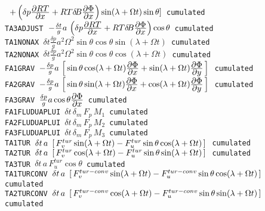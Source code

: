 \begin{tabbing}
        \tt                     \> $+\left(\delta p\frac{\displaystyle \partial RT}{\displaystyle \partial x}+RT\delta\! B\frac{\displaystyle \partial \Phi}{\displaystyle \partial x}\right)\sin(\lambda+\Omega t)\sin\theta]$ \> cumulated\\ [1ex]
        \tt TA3ADJUST           \> $-\frac{\delta t}{g}a\, \left(\delta p\frac{\displaystyle \partial RT}{\displaystyle \partial x}+RT\delta\! B\frac{\displaystyle \partial \Phi}{\displaystyle \partial x}\right)\cos\theta$ \> cumulated\\ [1ex]
        \tt TA1NONAX            \> $\delta t \frac{\delta p}{g} a^2 \Omega^2 \sin\theta \cos\theta\sin(\lambda+\Omega t)$ \> cumulated\\ [1ex]
        \tt TA2NONAX            \> $\delta t \frac{\delta p}{g} a^2 \Omega^2 \sin\theta \cos\theta\cos(\lambda+\Omega t)$ \> cumulated\\ [1ex]
        \tt FA1GRAV             \> $-\frac{\delta p}{g}a\, \left[ \,\sin\theta\cos(\lambda+\Omega t)\frac{\displaystyle \partial \Phi}{\displaystyle \partial x}+\sin(\lambda+\Omega t)\frac{\displaystyle \partial \Phi}{\displaystyle \partial y}\, \right] \,$ \> cumulated\\ [1ex]
        \tt FA2GRAV             \> $-\frac{\delta p}{g}a\, \left[ \,\sin\theta\sin(\lambda+\Omega t)\frac{\displaystyle \partial \Phi}{\displaystyle \partial x}+\cos(\lambda+\Omega t)\frac{\displaystyle \partial \Phi}{\displaystyle \partial y}\, \right] \,$ \> cumulated\\ [1ex]
        \tt FA3GRAV             \> $\frac{\delta p}{g}a \cos\theta\frac{\displaystyle \partial \Phi}{\displaystyle \partial x}$ \> cumulated\\ [1ex]
        \tt FA1FLUDUAPLUI       \> $\delta t \, \delta_m \, F_p\,  M_1$ \> cumulated\\ [1ex]
        \tt FA2FLUDUAPLUI       \> $\delta t \, \delta_m \, F_p\,  M_2$ \> cumulated\\ [1ex]
        \tt FA3FLUDUAPLUI       \> $\delta t \, \delta_m \, F_p\,  M_3$ \> cumulated\\ [1ex]
        \tt TA1TUR              \> $\delta t \, a \, \, \left[ \, F_{v}^{tur}\sin(\lambda+\Omega t)-F_{u}^{tur}\sin\theta\cos(\lambda+\Omega t)\, \right] \,$ \> cumulated\\ [1ex]
        \tt TA2TUR              \> $\delta t \, a \, \, \left[ \, F_{v}^{tur}\cos(\lambda+\Omega t)-F_{u}^{tur}\sin\theta\sin(\lambda+\Omega t)\, \right] \,$ \> cumulated\\ [1ex]
        \tt TA3TUR              \> $\delta t \, a \, F_{u}^{tur}\cos\theta$ \> cumulated\\ [1ex]
        \tt TA1TURCONV          \> $\delta t \, a \, \, \left[ \, F_{v}^{tur-conv}\sin(\lambda+\Omega t)-F_{u}^{tur-conv}\sin\theta\cos(\lambda+\Omega t)\, \right] \,$ \> cumulated\\ [1ex]
        \tt TA2TURCONV          \> $\delta t \, a \, \, \left[ \, F_{v}^{tur-conv}\cos(\lambda+\Omega t)-F_{u}^{tur-conv}\sin\theta\sin(\lambda+\Omega t)\, \right] \,$ \> cumulated\\ [1ex]

\end{tabbing}
